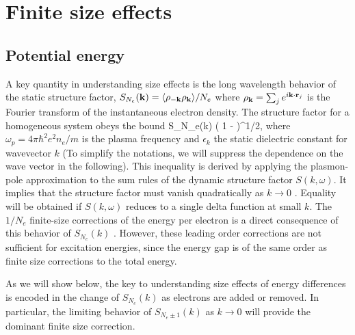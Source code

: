 \section{Finite size effects\label{sec:fse}}

\subsection{Potential energy}

A key quantity in understanding size effects is the long wavelength behavior of the static structure factor,
$S_{N_e}({\bf k})=\langle \rho_{-{\bf k}} \rho_{{\bf k}} \rangle/N_e$ where $\rho_{\bf k}=\sum_j e^{i {\bf k} \cdot {\bf r}_j}$ is the Fourier transform of the instantaneous electron density.
The structure factor for a homogeneous system obeys the bound \cite{Ceperley87,book}
\beq
S_{N_e}(k) \le {}\left( 1 -  \right)^{1/2},
\label{davidbound}
\eeq
where $\omega_p=4 \pi \hbar^2 e^2 n_e/m$ is the plasma frequency and $\epsilon_k$ the static dielectric constant for wavevector $k$ (To simplify the notations, we will suppress the dependence on the wave vector in the following). This inequality is derived by applying the plasmon-pole approximation to the sum rules of the dynamic structure factor $S(k, \omega)$. It implies that the structure factor must vanish quadratically as
$k \rightarrow 0$ \cite{Nozieres}.
Equality will be obtained if $S(k,\omega)$ reduces to a single delta function at small $k$.
The $1/N_e$ finite-size corrections of the energy per electron is a direct consequence of 
this behavior of $S_{N_e}(k)$ \cite{fse}. However, these leading order corrections are not sufficient for excitation energies, since the energy gap is of the same order as finite size corrections to the total energy.

As we will show below, the key to understanding size effects of energy differences is encoded in the change of $S_{N_e}(k)$ as electrons are added or removed. In particular, the limiting behavior of $S_{N_e\pm 1}(k)$ as $k\rightarrow0$ will provide the dominant finite size correction.

